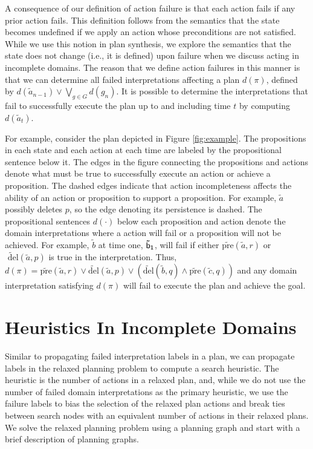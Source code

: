 \documentclass[letterpaper]{article}
\begin{document}
A consequence of our definition of action failure is that each action fails if
any prior action fails.  This definition follows from the semantics that the
state becomes undefined if we apply an action whose preconditions are not
satisfied.  While we use this notion in plan synthesis, we explore the semantics
that the state does not change (i.e., it is defined) upon failure when we
discuss acting in incomplete domains.  The reason that we define action failures
in this manner is that we can determine all failed interpretations affecting a
plan $d(\pi)$, defined  by  $d(\tilde{a}_{n-1}) \vee \bigvee_{g \in G} d(g_n)$.
It is possible to determine the interpretations that fail to successfully
execute the plan up to and including time $t$ by computing $d(\tilde{a}_t)$.

For example, consider the plan depicted in Figure \ref{fig:example}.  The
propositions in each state and each action at each time are labeled by the
propositional sentence below it. The edges in the figure connecting the
propositions and actions denote what must be true to successfully execute an
action or achieve a proposition.  The dashed edges indicate that action
incompleteness affects the ability of an action or proposition to support a
proposition.  For example, $\tilde{a}$ possibly deletes $p$, so the edge
denoting its persistence is dashed.  The propositional sentences  $d(\cdot)$
below each proposition and action denote the domain interpretations where a
action will fail or a proposition will not be achieved.  For example,
$\tilde{b}$ at time one, ${\sf \tilde{b}_1}$, will fail if either
$\widetilde{\text{pre}}(\tilde{a}, r)$ or $\widetilde{\text{ del}}(\tilde{a},
p)$ is true in the interpretation.  Thus, $d(\pi) =
\widetilde{\text{pre}}(\tilde{a}, r) \vee \widetilde{\text{del}}(\tilde{a},
p)\vee (\widetilde{\text{del}}(\tilde{b}, q) \wedge
\widetilde{\text{pre}}(\tilde{c}, q))$ and any domain interpretation satisfying
$d(\pi)$ will fail to execute the plan and achieve the goal.




\section{Heuristics In Incomplete Domains}

Similar to propagating failed interpretation labels in a plan, we can propagate
labels in the relaxed planning problem to compute a search heuristic.  The
heuristic is the number of actions in a relaxed plan, and, while we do not use
the number of failed domain interpretations as the primary heuristic, we use the
failure labels to bias the selection of the relaxed plan actions and break ties
between search nodes with an equivalent number of actions in their relaxed
plans.  We solve the relaxed planning problem using a planning graph and 
start with a brief description of planning graphs.
\end{document}
